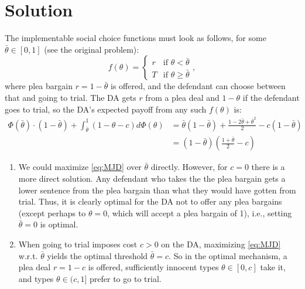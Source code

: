 \documentclass[a4paper]{article}
\begin{document}
\section*{Solution}
	The implementable social choice functions must look as follows, for some $\bar{\theta} \in [0,1]$ (see the original problem):
	\[ f(\theta)= \begin{cases} r & \text{if } \theta<\bar{\theta} \\
		T & \text{if } \theta\geq\bar{\theta} \end{cases}, \]
	where plea bargain $r= 1-\bar{\theta}$ is offered, and the defendant can choose between that and going to trial. 
	The DA gets $r$ from a plea deal and $1-\theta$ if the defendant goes to trial, so the DA's expected payoff from any such $f(\theta)$ is:
	\begin{equation}
		\label{eq:MJD}
		\begin{aligned}
			\Phi(\bar{\theta}) \cdot (1-\bar{\theta})+\int_{\bar{\theta}}^1 (1-\theta-c) d\Phi(\theta)
			&= \bar{\theta} (1-\bar{\theta}) + \frac{1-2\bar{\theta}+\bar{\theta}^2}{2} - c(1-\bar{\theta}) 
			\\&= (1-\bar{\theta}) \left(\frac{1+\bar{\theta}}{2} - c\right)
		\end{aligned}
	\end{equation}
	\begin{enumerate}
		\item We could maximize \eqref{eq:MJD} over $\bar{\theta}$ directly. However, for $c=0$ there is a more direct solution. Any defendant who takes the the plea bargain gets a lower sentence from the plea bargain than what they would have gotten from trial. Thus, it is clearly optimal for the DA not to offer any plea bargains (except perhaps to $\theta=0$, which will accept a plea bargain of 1), i.e., setting $\bar{\theta}=0$ is optimal.
		
		\item When going to trial imposes cost $c>0$ on the DA, maximizing \eqref{eq:MJD} w.r.t. $\bar{\theta}$ yields the optimal threshold $\bar{\theta}=c$. So in the optimal mechanism, a plea deal $r=1-c$ is offered, sufficiently innocent types $\theta \in [0,c]$ take it, and types $\theta \in (c,1]$ prefer to go to trial.
	\end{enumerate}
\fi
\end{document}
